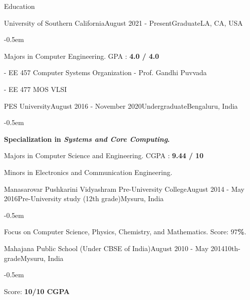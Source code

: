 \documentclass{CV} %
\begin{document}

\begin{rSection}{Education}


  \begin{rSubsection}{University of Southern California}{August 2021 - Present}{Graduate}{LA, CA, USA}
    \begin{list}{}{\footnotesize}\itemsep -0.5em \vspace{-0.5em}
      \item Majors in Computer Engineering. GPA : {\bf 4.0 / 4.0}
      \item - EE 457 Computer Systems Organization - Prof. Gandhi Puvvada
      \item - EE 477 MOS VLSI
    \end{list}
  \end{rSubsection}

  \begin{rSubsection}{PES University}{August 2016 - November 2020}{Undergraduate}{Bengaluru, India}
    \begin{list}{}{\footnotesize}\itemsep -0.5em \vspace{-0.5em}
      \item {\bf Specialization in \textit{Systems and Core Computing}.}
      \item Majors in Computer Science and Engineering. CGPA : {\bf 9.44 / 10}
      \item Minors in Electronics and Communication Engineering.
    \end{list}
  \end{rSubsection}
  
  \begin{rSubsection}{Manasarovar Pushkarini Vidyashram Pre-University College}{August 2014 - May 2016}{Pre-University study \tiny{(12th grade)}}{Mysuru, India}
    \begin{list}{}{\footnotesize}\itemsep -0.5em \vspace{-0.5em}
      \item Focus on Computer Science, Physics, Chemistry, and Mathematics. Score: {\bf $97$\%}.
    \end{list}
  \end{rSubsection}

  \begin{rSubsection}{Mahajana Public School \scriptsize{(Under CBSE of India)}}{August 2010 - May 2014}{10th-grade}{Mysuru, India}
    \begin{list}{}{\footnotesize}\itemsep -0.5em \vspace{-0.5em}
      \item Score: {\bf 10/10 CGPA}
    \end{list}
  \end{rSubsection}

\end{rSection}
\end{document}
